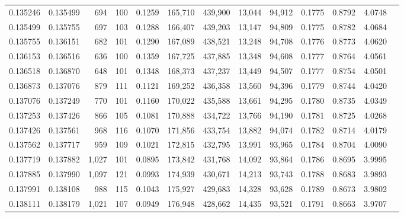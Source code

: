 \begin{tabular}{rrrrrrrrrrrrr}
0.135246 & 0.135499 &   694 & 100 &                                     0.1259 & 165,710 & 439,900 &  13,044 &  94,912 & 0.1775 & 0.8792 & 4.0748 \\
0.135499 & 0.135755 &   697 & 103 &                                     0.1288 & 166,407 & 439,203 &  13,147 &  94,809 & 0.1775 & 0.8782 & 4.0684 \\
0.135755 & 0.136151 &   682 & 101 &                                     0.1290 & 167,089 & 438,521 &  13,248 &  94,708 & 0.1776 & 0.8773 & 4.0620 \\
0.136153 & 0.136516 &   636 & 100 &                                     0.1359 & 167,725 & 437,885 &  13,348 &  94,608 & 0.1777 & 0.8764 & 4.0561 \\
0.136518 & 0.136870 &   648 & 101 &                                     0.1348 & 168,373 & 437,237 &  13,449 &  94,507 & 0.1777 & 0.8754 & 4.0501 \\
0.136873 & 0.137076 &   879 & 111 &                                     0.1121 & 169,252 & 436,358 &  13,560 &  94,396 & 0.1779 & 0.8744 & 4.0420 \\
0.137076 & 0.137249 &   770 & 101 &                                     0.1160 & 170,022 & 435,588 &  13,661 &  94,295 & 0.1780 & 0.8735 & 4.0349 \\
0.137253 & 0.137426 &   866 & 105 &                                     0.1081 & 170,888 & 434,722 &  13,766 &  94,190 & 0.1781 & 0.8725 & 4.0268 \\
0.137426 & 0.137561 &   968 & 116 &                                     0.1070 & 171,856 & 433,754 &  13,882 &  94,074 & 0.1782 & 0.8714 & 4.0179 \\
0.137562 & 0.137717 &   959 & 109 &                                     0.1021 & 172,815 & 432,795 &  13,991 &  93,965 & 0.1784 & 0.8704 & 4.0090 \\
0.137719 & 0.137882 & 1,027 & 101 &                                     0.0895 & 173,842 & 431,768 &  14,092 &  93,864 & 0.1786 & 0.8695 & 3.9995 \\
0.137885 & 0.137990 & 1,097 & 121 &                                     0.0993 & 174,939 & 430,671 &  14,213 &  93,743 & 0.1788 & 0.8683 & 3.9893 \\
0.137991 & 0.138108 &   988 & 115 &                                     0.1043 & 175,927 & 429,683 &  14,328 &  93,628 & 0.1789 & 0.8673 & 3.9802 \\
0.138111 & 0.138179 & 1,021 & 107 &                                     0.0949 & 176,948 & 428,662 &  14,435 &  93,521 & 0.1791 & 0.8663 & 3.9707 \\

\end{tabular}
